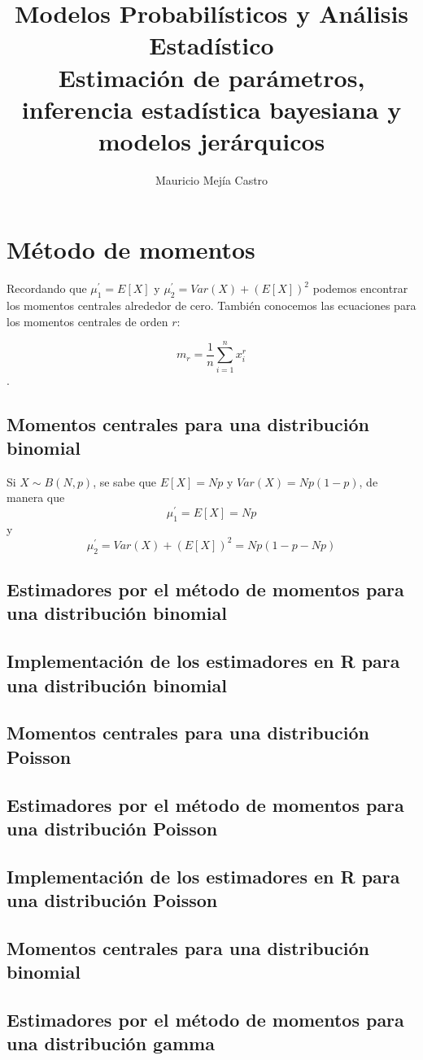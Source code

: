 \documentclass[10pt,letterpaper]{article}
\title{Modelos Probabilísticos y Análisis Estadístico\\Estimación de parámetros, inferencia estadística bayesiana y modelos jerárquicos}
\author{Mauricio Mejía Castro}
\begin{document}
\maketitle

\section{Método de momentos}
Recordando que $\mu_1^{'}=E[X]$ y $\mu_2^{'}=Var(X)+(E[X])^2$ podemos encontrar los momentos centrales alrededor de cero. También conocemos las ecuaciones para los momentos centrales de orden $r$:

\[ m_r = \frac{1}{n}\sum_{i=1}^{n}x_i^r \].

\subsection{Momentos centrales para una distribución binomial}
Si $X\sim B(N, p)$, se sabe que $E[X]=Np$ y $Var(X)=Np(1-p)$, de manera que \[\mu_1^{'}=E[X]=Np\] y \[\mu_2^{'}=Var(X)+(E[X])^2=Np(1-p-Np)\]
\subsection{Estimadores por el método de momentos para una distribución binomial}
\subsection{Implementación de los estimadores en R para una distribución binomial}

\subsection{Momentos centrales para una distribución Poisson}
\subsection{Estimadores por el método de momentos para una distribución Poisson}
\subsection{Implementación de los estimadores en R para una distribución Poisson}

\subsection{Momentos centrales para una distribución binomial}
\subsection{Estimadores por el método de momentos para una distribución gamma}
\end{document}
